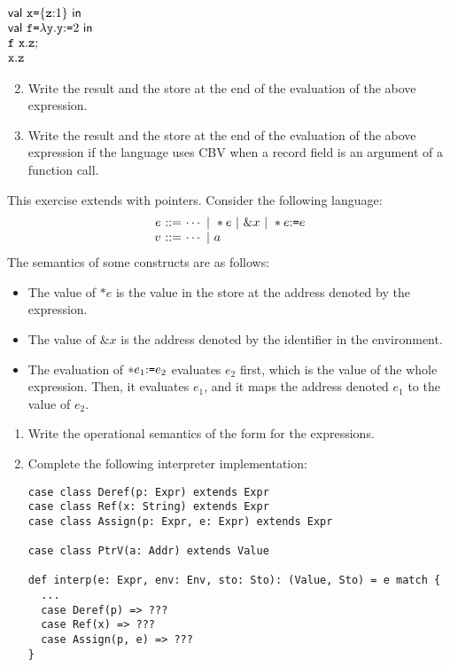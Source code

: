 \begin{exercise}
$
\begin{array}{@{}l@{}}
  \ebind{\cx}{\{\cz{:}1\}}{ \\
  \ebind{\cf}{\efun{\cy}{\eset{\cy}{2}}}{ \\
  \eseq{\eapp{\cf}{\cx.\cz}}{ \\
  \cx.\cz}}}
\end{array}
$

\begin{enumerate}
  \setcounter{enumi}{1}
  \item Write the result and the store at the end of the evaluation of
  the above expression.
  \item Write the result and the store at the end of the evaluation of
  the above expression
  if the language uses CBV when a record field is an argument
  of a function call.
\end{enumerate}

\end{exercise}

\begin{exercise}

This exercise extends \lang with pointers.
Consider the following language:
\[
  \begin{array}{@{}r@{~}r@{~}l@{}}
    e & ::= & \cdots\ |\ \ast e \ |\ \& x\ |\ \ast\eset{e}{e} \\
    v & ::= & \cdots\ |\ a \\
  \end{array}
\]
The semantics of some constructs are as follows:
\begin{itemize}
  \item The value of $\ast e$ is the value in the store at the address denoted by
    the expression.
  \item The value of $\& x$ is the address denoted by the identifier in the environment.
  \item The evaluation of $\ast e_1{:}\texttt{=} e_2$ evaluates $e_2$ first, which is
    the value of the whole expression. Then, it evaluates $e_1$, and it maps the
    address denoted $e_1$ to the value of $e_2$.
\end{itemize}
\begin{enumerate}
  \item
Write the operational semantics of the form  for the expressions.
  \item
Complete the following interpreter implementation:
\begin{verbatim}
case class Deref(p: Expr) extends Expr
case class Ref(x: String) extends Expr
case class Assign(p: Expr, e: Expr) extends Expr

case class PtrV(a: Addr) extends Value

def interp(e: Expr, env: Env, sto: Sto): (Value, Sto) = e match {
  ...
  case Deref(p) => ???
  case Ref(x) => ???
  case Assign(p, e) => ???
}
\end{verbatim}
\end{enumerate}

\end{exercise}

